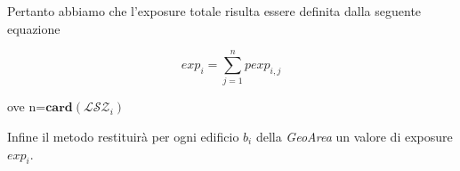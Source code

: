 Pertanto abbiamo che l'exposure totale risulta essere definita dalla seguente equazione

\begin{equation}\label{eq:exposure1}
exp_i =\sum_{j=1}^n pexp_{i,j}
\end{equation}

ove n=$\mathbf{card}(\mathcal{LSZ}_i)$
\bigbreak

Infine il metodo restituirà per ogni edificio $b_i$ della \textit{GeoArea} un valore di exposure $exp_i$.






